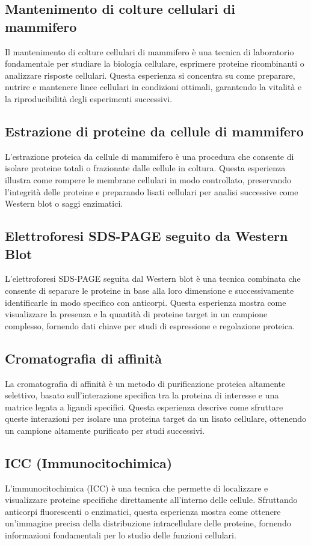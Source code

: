 \subsection{Mantenimento di colture cellulari di mammifero}
Il mantenimento di colture cellulari di mammifero è una tecnica di laboratorio fondamentale per studiare la biologia cellulare, esprimere proteine ricombinanti o analizzare risposte cellulari. Questa esperienza si concentra su come preparare, nutrire e mantenere linee cellulari in condizioni ottimali, garantendo la vitalità e la riproducibilità degli esperimenti successivi.

\subsection{Estrazione di proteine da cellule di mammifero}
L’estrazione proteica da cellule di mammifero è una procedura che consente di isolare proteine totali o frazionate dalle cellule in coltura. Questa esperienza illustra come rompere le membrane cellulari in modo controllato, preservando l’integrità delle proteine e preparando lisati cellulari per analisi successive come Western blot o saggi enzimatici.

\subsection{Elettroforesi SDS-PAGE seguito da Western Blot}
L’elettroforesi SDS-PAGE seguita dal Western blot è una tecnica combinata che consente di separare le proteine in base alla loro dimensione e successivamente identificarle in modo specifico con anticorpi. Questa esperienza mostra come visualizzare la presenza e la quantità di proteine target in un campione complesso, fornendo dati chiave per studi di espressione e regolazione proteica.

\subsection{Cromatografia di affinità}
La cromatografia di affinità è un metodo di purificazione proteica altamente selettivo, basato sull’interazione specifica tra la proteina di interesse e una matrice legata a ligandi specifici. Questa esperienza descrive come sfruttare queste interazioni per isolare una proteina target da un lisato cellulare, ottenendo un campione altamente purificato per studi successivi.

\subsection{ICC (Immunocitochimica)}
L’immunocitochimica (ICC) è una tecnica che permette di localizzare e visualizzare proteine specifiche direttamente all’interno delle cellule. Sfruttando anticorpi fluorescenti o enzimatici, questa esperienza mostra come ottenere un’immagine precisa della distribuzione intracellulare delle proteine, fornendo informazioni fondamentali per lo studio delle funzioni cellulari.
